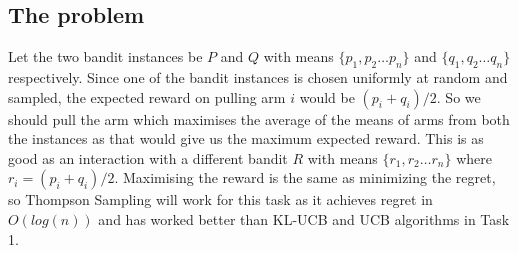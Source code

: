 \documentclass[11pt]{article}
\begin{document}
\subsection*{The problem}

\noindent
Let the two bandit instances be $P$ and $Q$ with means 
$\{p_1, p_2 \dots p_n\}$ and $\{q_1, q_2 \dots q_n\}$ respectively.
Since one of the bandit instances is chosen uniformly at random and sampled, the expected 
reward on pulling arm $i$ would be $(p_i + q_i)/2$. So we should pull the arm which maximises the average of the means of 
arms from both the instances as that would give us the maximum expected reward. This is as good as an 
interaction with a different bandit $R$ with means $\{r_1, r_2 \dots r_n\}$ where $r_i = (p_i + q_i)/2$. 
Maximising the reward is the same as minimizing the regret, so Thompson Sampling will work for this task
as it achieves regret in $O(log(n))$ and has worked better than KL-UCB and UCB 
algorithms in Task 1.
\end{document}
